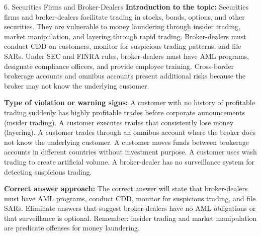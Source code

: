 \documentclass[11pt,a4paper]{beamer}
\begin{document}
\begin{frame}{6. Securities Firms and Broker-Dealers}
\tiny
\noindent\textbf{Introduction to the topic:} Securities firms and broker-dealers facilitate trading in stocks, bonds, options, and other securities. They are vulnerable to money laundering through insider trading, market manipulation, and layering through rapid trading. Broker-dealers must conduct CDD on customers, monitor for suspicious trading patterns, and file SARs. Under SEC and FINRA rules, broker-dealers must have AML programs, designate compliance officers, and provide employee training. Cross-border brokerage accounts and omnibus accounts present additional risks because the broker may not know the underlying customer.

\vspace{0.1cm}
\noindent\textbf{Type of violation or warning signs:} A customer with no history of profitable trading suddenly has highly profitable trades before corporate announcements (insider trading). A customer executes trades that consistently lose money (layering). A customer trades through an omnibus account where the broker does not know the underlying customer. A customer moves funds between brokerage accounts in different countries without investment purpose. A customer uses wash trading to create artificial volume. A broker-dealer has no surveillance system for detecting suspicious trading.

\vspace{0.1cm}
\noindent\textbf{Correct answer approach:} The correct answer will state that broker-dealers must have AML programs, conduct CDD, monitor for suspicious trading, and file SARs. Eliminate answers that suggest broker-dealers have no AML obligations or that surveillance is optional. Remember: insider trading and market manipulation are predicate offenses for money laundering.
\end{frame}
\end{document}
